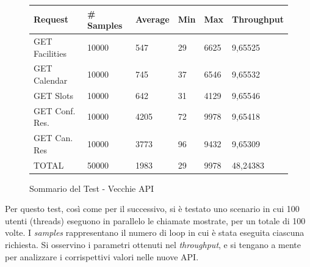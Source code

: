 \begin{figure}[H]
    \begin{table}[H]
        \centering
        \begin{tabular}{ |p{3cm}||p{2cm}|p{2cm}|p{1cm}|p{1cm}|p{2cm}| }
            \hline
            Request & \# Samples & Average  & Min & Max &  Throughput\\
            \hline
            GET Facilities      & 10000    & 547   & 29 & 6625 & 9,65525      \\
            GET Calendar        & 10000    & 745   & 37 & 6546        & 9,65532      \\
            GET Slots        & 10000    & 642   & 31 & 4129        & 9,65546      \\
            GET Conf. Res.        & 10000    & 4205    & 72 & 9978        & 9,65418      \\
            GET Can. Res        & 10000    & 3773    & 96 & 9432        & 9,65309      \\
            TOTAL        & 50000    & 1983    & 29 & 9978        & 48,24383      \\
            \hline
        \end{tabular}
    \end{table}
    \caption{Sommario del Test - Vecchie API}
    \label{fig:oldapi100t_summary}
\end{figure}
Per questo test, così come per il successivo, si è testato uno scenario in cui 100 utenti (threads) eseguono in parallelo le chiamate mostrate, per un totale di 100 volte. I \emph{samples} rappresentano il numero di loop in cui è stata eseguita ciascuna richiesta. Si osservino i parametri ottenuti nel \emph{throughput}, e si tengano a mente per analizzare i corrispettivi valori nelle nuove API.

